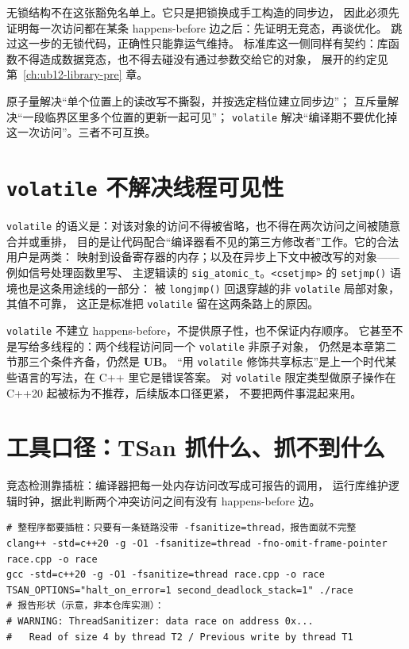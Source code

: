 \documentclass[12pt,a4paper,fontset=fandol]{ctexbook}
\newcommand{\cpp}[1]{C++#1}
\newcommand{\Fn}[1]{\texttt{#1()}}
\newcommand{\Tp}[1]{\texttt{#1}}
\newcommand{\Lang}[1]{\textsf{#1}}
\newcommand{\CPP}{\Lang{C++}}
\newcommand{\UB}{\textbf{\textsf{UB}}}
\newcommand{\Hdr}[1]{\texttt{<#1>}}
\begin{document}
无锁结构不在这张豁免名单上。它只是把锁换成手工构造的同步边，
因此必须先证明每一次访问都在某条 happens-before 边之后：先证明无竞态，再谈优化。
跳过这一步的无锁代码，正确性只能靠运气维持。
标准库这一侧同样有契约：库函数不得造成数据竞态，也不得去碰没有通过参数交给它的对象，
展开的约定见第~\ref{ch:ub12-library-pre} 章。

\begin{compare}[title={原子、互斥与 volatile 的分工}]
原子量解决“单个位置上的读改写不撕裂，并按选定档位建立同步边”；
互斥量解决“一段临界区里多个位置的更新一起可见”；
\Tp{volatile} 解决“编译期不要优化掉这一次访问”。三者不可互换。
\end{compare}

\section{\Tp{volatile} 不解决线程可见性}\label{sec:ub10-volatile}

\Tp{volatile} 的语义是：对该对象的访问不得被省略，也不得在两次访问之间被随意合并或重排，
目的是让代码配合“编译器看不见的第三方修改者”工作。它的合法用户是两类：
映射到设备寄存器的内存；以及在异步上下文中被改写的对象——例如信号处理函数里写、
主逻辑读的 \Tp{sig\_atomic\_t}。\Hdr{csetjmp} 的 \Fn{setjmp} 语境也是这条用途线的一部分：
被 \Fn{longjmp} 回退穿越的非 \Tp{volatile} 局部对象，其值不可靠，
这正是标准把 \Tp{volatile} 留在这两条路上的原因。

\begin{warning}[title={不要把 volatile 当同步}]
\Tp{volatile} 不建立 happens-before，不提供原子性，也不保证内存顺序。
它甚至不是写给多线程的：两个线程访问同一个 \Tp{volatile} 非原子对象，
仍然是本章第二节那三个条件齐备，仍然是 \UB{}。
“用 \Tp{volatile} 修饰共享标志”是上一个时代某些语言的写法，在 \CPP{} 里它是错误答案。
对 \Tp{volatile} 限定类型做原子操作在 \cpp{20} 起被标为不推荐，后续版本口径更紧，
不要把两件事混起来用。
\end{warning}

\section{工具口径：TSan 抓什么、抓不到什么}\label{sec:ub10-tsan}

竞态检测靠插桩：编译器把每一处内存访问改写成可报告的调用，
运行库维护逻辑时钟，据此判断两个冲突访问之间有没有 happens-before 边。

\begin{lstlisting}[style=shellstyle, caption={ThreadSanitizer 的最小可用命令}]
# 整程序都要插桩：只要有一条链路没带 -fsanitize=thread，报告面就不完整
clang++ -std=c++20 -g -O1 -fsanitize=thread -fno-omit-frame-pointer race.cpp -o race
gcc -std=c++20 -g -O1 -fsanitize=thread race.cpp -o race
TSAN_OPTIONS="halt_on_error=1 second_deadlock_stack=1" ./race
# 报告形状（示意，非本仓库实测）：
# WARNING: ThreadSanitizer: data race on address 0x...
#   Read of size 4 by thread T2 / Previous write by thread T1
\end{lstlisting}
\end{document}
